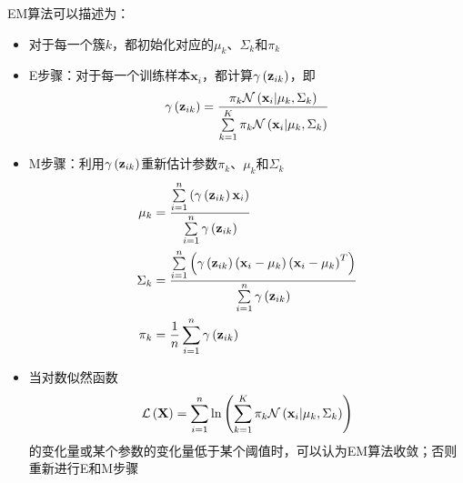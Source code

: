 EM算法可以描述为：
\begin{itemize}
    \item 对于每一个簇$k$，都初始化对应的$\mu_k$、$\Sigma_k$和$\pi_k$
    \item E步骤：对于每一个训练样本$\mathbf{x}_i$，都计算$\gammaz{k}$，即
    \begin{equation*}
        \gammaz{k}=\dfrac{\pi_k\gauss}{\sumk\pi_k\gauss}
    \end{equation*}
    \item M步骤：利用$\gammaz{k}$重新估计参数$\pi_k$、$\mu_k$和$\Sigma_k$
    \begin{align*}
        \mu_k    &= \dfrac{\sumn\left(\gammaz{k}\mathbf{x}_i\right)}{\sumn\gammaz{k}} \\
        \Sigma_k &= \dfrac{\sumn\left(\gammaz{k}\left(\mathbf{x}_i-\mu_k\right)\left(\mathbf{x}_i-\mu_k\right)^T\right)}{\sumn\gammaz{k}} \\
        \pi_k    &= \dfrac{1}{n}\sumn\gammaz{k}
    \end{align*}
    \item 当对数似然函数
    \begin{equation*}
        \mathcal{L}\left(\mathbf{X}\right)=\sumn\ln\left(\sumk\pi_k\gauss\right)
    \end{equation*}
    的变化量或某个参数的变化量低于某个阈值时，可以认为EM算法收敛\cite{PRML}；否则重新进行E和M步骤
\end{itemize}
